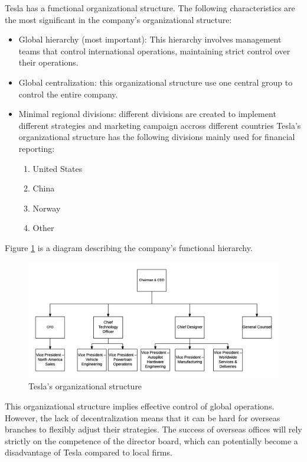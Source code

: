 \documentclass[12pt]{article}
\begin{document}
Tesla has a functional organizational structure. The following characteristics are the most significant in the company's organizational structure:

\begin{itemize}
	\item{Global hierarchy (most important): This hierarchy involves management teams that control international operations, maintaining strict control over their operations.}
	\item{Global centralization: this organizational structure use one central group to control the entire company.}
	\item{Minimal regional divisions: different divisions are created to implement different strategies and marketing campaign accross different countries Tesla’s organizational structure has the following divisions mainly used for financial reporting:
	\begin{enumerate}
		\item{United States}
		\item{China}
		\item{Norway}
		\item{Other}
	\end{enumerate}
	}
\end{itemize}

Figure \ref{structpic} is a diagram describing the company's functional hierarchy.

\begin{figure}
	\includegraphics[width=\textwidth]{TeslaStruct.png}
	\caption{Tesla's organizational structure\label{structpic}}
\end{figure}

This organizational structure implies effective control of global operations. However, the lack of decentralization means that it can be hard for overseas branches to flexibly adjust their strategies. The success of overseas offices will rely strictly on the competence of the director board, which can potentially become a disadvantage of Tesla compared to local firms.
\end{document}
